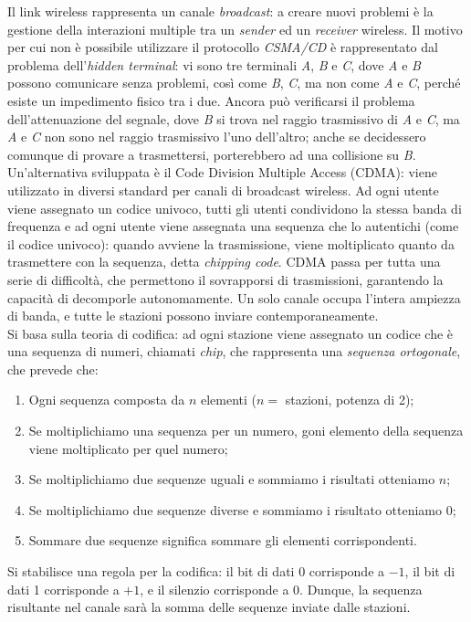 Il link wireless rappresenta un canale \textit{broadcast}: a creare nuovi problemi è la gestione della interazioni multiple tra un \textit{sender} ed un \textit{receiver} wireless. Il motivo per cui non è possibile utilizzare il protocollo \textit{CSMA/CD} è rappresentato dal problema dell'\textit{hidden terminal}: vi sono tre terminali \textit{A}, \textit{B} e \textit{C}, dove \textit{A} e \textit{B} possono comunicare senza problemi, così come \textit{B}, \textit{C}, ma non come \textit{A} e \textit{C}, perché esiste un impedimento fisico tra i due. Ancora può verificarsi il problema dell'attenuazione del segnale, dove \textit{B} si trova nel raggio trasmissivo di \textit{A} e \textit{C}, ma \textit{A} e \textit{C} non sono nel raggio trasmissivo l'uno dell'altro; anche se decidessero comunque di provare a trasmettersi, porterebbero ad una collisione su \textit{B}. \\
Un'alternativa sviluppata è il Code Division Multiple Access (CDMA): viene utilizzato in diversi standard per canali di broadcast wireless. Ad ogni utente viene assegnato un codice univoco, tutti gli utenti condividono la stessa banda di frequenza e ad ogni utente viene assegnata una sequenza che lo autentichi (come il codice univoco): quando avviene la trasmissione, viene moltiplicato quanto da trasmettere con la sequenza, detta \textit{chipping code}. CDMA passa per tutta una serie di difficoltà, che permettono il sovrapporsi di trasmissioni, garantendo la capacità di decomporle autonomamente.
Un solo canale occupa l'intera ampiezza di banda, e tutte le stazioni possono inviare contemporaneamente. \\
Si basa sulla teoria di codifica: ad ogni stazione viene assegnato un codice che è una sequenza di numeri, chiamati \textit{chip}, che rappresenta una \textit{sequenza ortogonale}, che prevede che:
\begin{enumerate}
	\item Ogni sequenza composta da $n$ elementi ($n = $ stazioni, potenza di 2);
	\item Se moltiplichiamo una sequenza per un numero, goni elemento della sequenza viene moltiplicato per quel numero;
	\item Se moltiplichiamo due sequenze uguali e sommiamo i risultati otteniamo $n$;
	\item Se moltiplichiamo due sequenze diverse e sommiamo i risultato otteniamo 0;
	\item Sommare due sequenze significa sommare gli elementi corrispondenti.
\end{enumerate}
Si stabilisce una regola per la codifica: il bit di dati 0 corrisponde a $-1$, il bit di dati 1 corrisponde a $+1$, e il silenzio corrisponde a 0. Dunque, la sequenza risultante nel canale sarà la somma delle sequenze inviate dalle stazioni.

